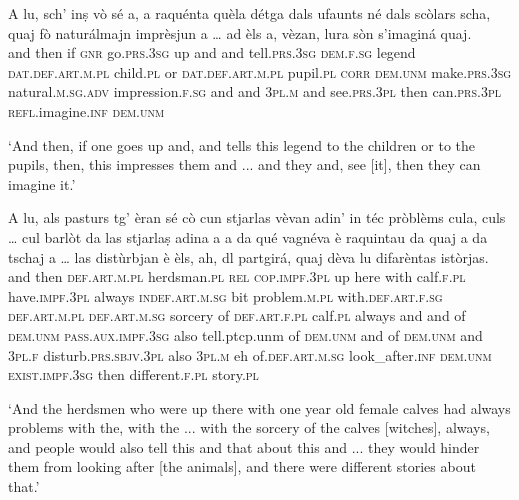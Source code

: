 \begin{linenumbers}
	\gll A lu, sch’ inṣ vò sé a, a raquénta quèla détga dals ufaunts né dals scòlars scha, quaj fò naturálmajn imprèsjun a … ad èls a, vèzan, lura sòn s’imaginá quaj.\\
and then if \textsc{gnr} go.\textsc{prs.3sg} up and and tell.\textsc{prs.3sg} \textsc{dem.f.sg} legend \textsc{dat.def.art.m.pl} child.\textsc{pl} or \textsc{dat.def.art.m.pl} pupil.\textsc{pl} \textsc{corr} \textsc{dem.unm} make.\textsc{prs.3sg} natural.\textsc{m.sg.adv} impression.\textsc{f.sg} and {} and \textsc{3pl.m} and see.\textsc{prs.3pl} then can.\textsc{prs.3pl} \textsc{refl}.imagine.\textsc{inf} \textsc{dem.unm}\\
\end{linenumbers}
\medskip
\glt `And then, if one goes up and, and tells this legend to the children or to the pupils, then, this impresses them and ... and they and, see [it], then they can imagine it.'
\medskip

\begin{linenumbers}
	\gll A lu, als pasturs tg’ èran sé cò cun stjarlas vèvan adin’ in téc pròblèms cula, culs … cul barlòt da las stjarlaṣ\footnotemark{} adina a a da qué vagnéva è raquintau da quaj a da tschaj a … las distùrbjan è èls, ah, dl partgirá, quaj dèva lu difarèntas istòrjas.\\
and then \textsc{def.art.m.pl} herdsman.\textsc{pl} \textsc{rel} \textsc{cop.impf.3pl} up here with calf.\textsc{f.pl} have.\textsc{impf.3pl} always \textsc{indef.art.m.sg} bit problem.\textsc{m.pl} with.\textsc{def.art.f.sg} \textsc{def.art.m.pl} {} \textsc{def.art.m.sg} sorcery of \textsc{def.art.f.pl} calf.\textsc{pl} always and and of \textsc{dem.unm} \textsc{pass.aux.impf.3sg} also tell.ptcp.unm of \textsc{dem.unm} and of \textsc{dem.unm} and {} \textsc{3pl.f} disturb.\textsc{prs.sbjv.3pl} also \textsc{3pl.m} eh of.\textsc{def.art.m.sg} look\_after.\textsc{inf} \textsc{dem.unm} \textsc{exist.impf.3sg} then different.\textsc{f.pl} story.\textsc{pl} \\
\end{linenumbers}
\medskip
\glt `And the herdsmen who were up there with one year old female calves had always problems with the, with the ... with the sorcery of the calves [witches], always, and people would also tell this and that about this and ... they would hinder them from looking after [the animals], and there were different stories about that.'
\medskip

